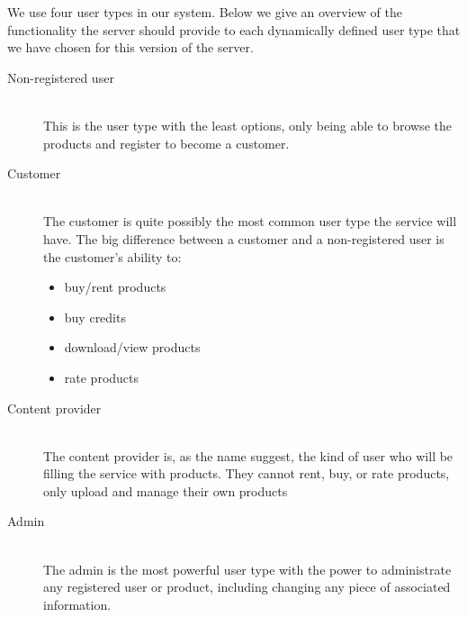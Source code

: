 \label{s_actor-goal-list}
We use four user types in our system. Below we give an overview of the functionality the server should provide to each dynamically defined user type that we have chosen for this version of the server. 

\begin{description}
	\item [Non-registered user] \hfill \\
		This is the user type with the least options, only being able to browse the products and register to become a customer.
	\item [Customer]  \hfill \\
		The customer is quite possibly the most common user type the service will have. The big difference between a customer and a non-registered user is the customer's ability to:
		\begin{itemize}
			\item buy/rent products
			\item buy credits
			\item download/view products
			\item rate products
		\end{itemize}
	\item [Content provider] \hfill \\
		The content provider is, as the name suggest, the kind of user who will be filling the service with products. They cannot rent, buy, or rate products, only upload and manage their own products
	\item [Admin] \hfill \\
		The admin is the most powerful user type with the power to administrate any registered user or product, including changing any piece of associated information.
\end{description}